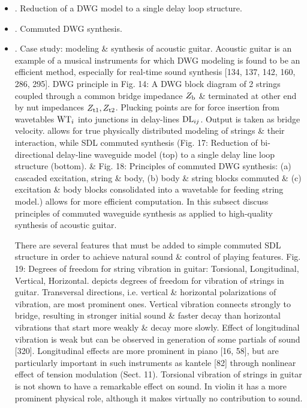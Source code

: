 \documentclass{article}
\begin{document}
\begin{itemize}
\begin{itemize}
		\item {. Reduction of a DWG model to a single delay loop structure.}
		\item {. Commuted DWG synthesis.}
		\item {. Case study: modeling \& synthesis of acoustic guitar.} Acoustic guitar is an example of a musical instruments for which DWG modeling is found to be an efficient method, especially for real-time sound synthesis [134, 137, 142, 160, 286, 295]. DWG principle in {\sf Fig. 14: A DWG block diagram of 2 strings coupled through a common bridge impedance $Z_{\rm b}$ \& terminated at other end by nut impedances $Z_{\rm t1},Z_{\rm t2}$. Plucking points are for force insertion from wavetables ${\rm WT}_i$ into junctions in delay-lines ${\rm DL}_{ij}$. Output is taken as bridge velocity.} allows for true physically distributed modeling of strings \& their interaction, while SDL commuted synthesis ({\sf Fig. 17: Reduction of bi-directional delay-line waveguide model (top) to a single delay line loop structure (bottom).} \& {\sf Fig. 18: Principles of commuted DWG synthesis: (a) cascaded excitation, string \& body, (b) body \& string blocks commuted \& (c) excitation \& body blocks consolidated into a wavetable for feeding string model.}) allows for more efficient computation. In this subsect discuss principles of commuted waveguide synthesis as applied to high-quality synthesis of acoustic guitar.
		
		There are several features that must be added to simple commuted SDL structure in order to achieve natural sound \& control of playing features. {\sf Fig. 19: Degrees of freedom for string vibration in guitar: Torsional, Longitudinal, Vertical, Horizontal.} depicts degrees of freedom for vibration of strings in guitar. Transversal directions, i.e. vertical \& horizontal polarizations of vibration, are most prominent ones. Vertical vibration connects strongly to bridge, resulting in stronger initial sound \& faster decay than horizontal vibrations that start more weakly \& decay more slowly. Effect of longitudinal vibration is weak but can be observed in generation of some partials of sound [320]. Longitudinal effects are more prominent in piano [16, 58], but are particularly important in such instruments as kantele [82] through nonlinear effect of tension modulation (Sect. 11). Torsional vibration of strings in guitar is not shown to have a remarkable effect on sound. In violin it has a more prominent physical role, although it makes virtually no contribution to sound.
		

\end{itemize}
\end{itemize}
\end{document}
